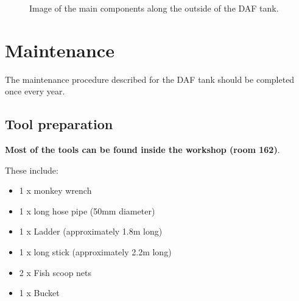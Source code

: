 \documentclass[
  12pt,
]{report}
\providecommand{\tightlist}{%
  \setlength{\itemsep}{0pt}\setlength{\parskip}{0pt}}\usepackage{longtable,booktabs,array}
\begin{document}
\begin{figure}[H]

\begin{minipage}[t]{0.50\linewidth}

{\centering 


}

\end{minipage}%
%
\begin{minipage}[t]{0.50\linewidth}

{\centering 


}

\end{minipage}%

\caption{\label{fig-dafcomp}Image of the main components along the
outside of the DAF tank.}

\end{figure}

\hypertarget{sec-daf-maintain}{%
\section{Maintenance}\label{sec-daf-maintain}}

{The maintenance procedure described for the DAF tank should be
completed once every year}.

\hypertarget{sec-daf-tool}{%
\subsection{Tool preparation}\label{sec-daf-tool}}

\textbf{Most of the tools can be found inside the workshop (room 162)}.

These include:

\begin{itemize}
\tightlist
\item
  1 x monkey wrench
\item
  1 x long hose pipe (50mm diameter)
\item
  1 x Ladder (approximately 1.8m long)
\item
  1 x long stick (approximately 2.2m long)
\item
  2 x Fish scoop nets
\item
  1 x Bucket
\end{itemize}
\end{document}
